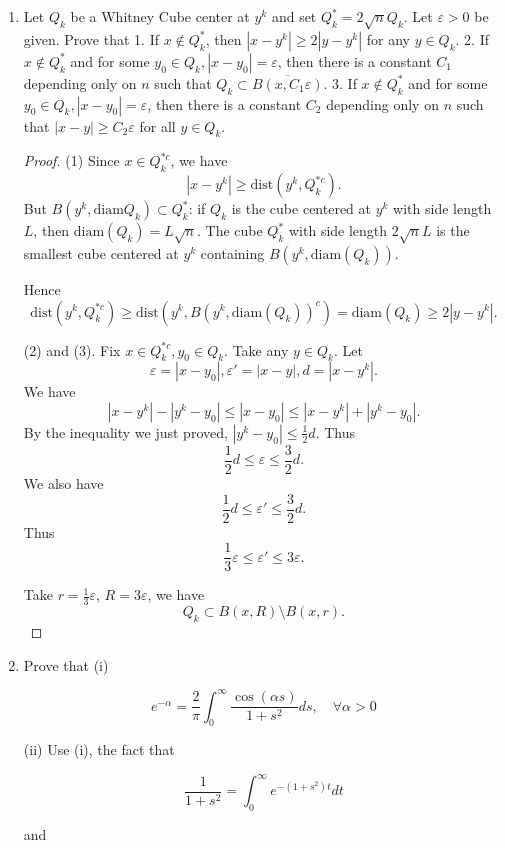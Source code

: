 
\begin{enumerate}
\item Let $Q_k$ be a Whitney Cube center at $y^k$ and set $Q_k^*=2 \sqrt{n} Q_k$. Let $\varepsilon>0$ be given. Prove that
1. If $x \notin Q_k^*$, then $\left|x-y^k\right| \geq 2\left|y-y^k\right|$ for any $y \in Q_k$.
2. If $x \notin Q_k^*$ and for some $y_0 \in Q_k,\left|x-y_0\right|=\varepsilon$, then there is a constant $C_1$ depending only on $n$ such that $Q_k \subset \overline{B\left(x, C_1 \varepsilon\right)}$.
3. If $x \notin Q_k^*$ and for some $y_0 \in Q_k,\left|x-y_0\right|=\varepsilon$, then there is a constant $C_2$ depending only on $n$ such that $|x-y| \geq C_2 \varepsilon$ for all $y \in Q_k$.
\begin{proof}
(1)
Since $x \in Q_k^{* c}$, we have
\[
	|x - y^k| \ge \text{dist}(y^k, Q_k^{* c})
.\] 
But $B(y^k, \text{diam}Q_k) \subset Q_k^*$: if $Q_k$ is the cube centered at $y^k$ with side length $L$, then $\text{diam}(Q_k) = L\sqrt{n} $. The cube $Q_k^*$ with side length $2 \sqrt{n} L$ is the smallest cube centered at $y^k$ containing $B(y^k, \text{diam}(Q_k))$.

Hence
\[
	\text{dist}(y^k, Q_k^{* c}) \ge 
	\text{dist}(y^k, B(y^k, \text{diam}(Q_k))^c)
	= \text{diam}(Q_k) \ge 2 |y - y^k|
.\] 

(2) and (3). Fix $x \in Q_k^{* c}, y_0 \in Q_k$. Take any $y \in Q_k$. Let
\[
	\varepsilon = |x - y_0|, \varepsilon' = |x - y|, d = |x - y^k|
.\]
We have
\[
	|x - y^k| - |y^k - y_0| \le |x - y_0| \le |x - y^k| + |y^k - y_0|
.\] 
By the inequality we just proved, $|y^k - y_0| \le \frac{1}{2} d$. Thus
\[
	\frac{1}{2} d \le \varepsilon \le \frac{3}{2} d
.\]
We also have
\[
	\frac{1}{2} d \le  \varepsilon' \le \frac{3}{2} d
.\] 
Thus
\[
	\frac{1}{3} \varepsilon \le \varepsilon' \le 3 \varepsilon
.\] 

Take $r = \frac{1}{3} \varepsilon$, $R = 3 \varepsilon$, we have
\[
	Q_k \subset B(x, R) \setminus B(x, r)
.\] 
\end{proof}

\item 
Prove that
(i)

\[
e^{-\alpha}=\frac{2}{\pi} \int_0^{\infty} \frac{\cos (\alpha s)}{1+s^2} d s, \quad \forall \alpha>0
\]

(ii) Use (i), the fact that

\[
\frac{1}{1+s^2}=\int_0^{\infty} e^{-\left(1+s^2\right) t} d t
\]

and


\end{enumerate}
